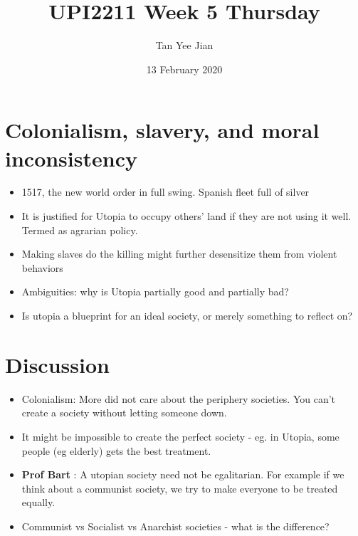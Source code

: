 \documentclass[12pt, a4paper]{article}
\title{UPI2211 Week 5 Thursday}
\author{Tan Yee Jian}
\date{13 February 2020}
\begin{document}
  \maketitle
  \section{Colonialism, slavery, and moral\\inconsistency}%
  \begin{itemize}
    \item 1517, the new world order in full swing. Spanish fleet full of silver
    \item It is justified for Utopia to occupy others' land if they are not
      using it well. Termed as agrarian policy.
    \item Making slaves do the killing might further desensitize them from
      violent behaviors
    \item Ambiguities: why is Utopia partially good and partially bad?
    \item Is utopia a blueprint for an ideal society, or merely something
      to reflect on?
  \end{itemize}
  \section{Discussion}
  \begin{itemize}
    \item Colonialism: More did not care about the periphery societies.
      You can't create a society without letting someone down.
    \item It might be impossible to create the perfect society - eg. in Utopia,
      some people (eg elderly) gets the best treatment.
    \item \textbf{Prof Bart} : A utopian society need not be egalitarian.
      For example if we think about a communist society, we try to make everyone
      to be treated equally.
    \item Communist vs Socialist vs Anarchist societies - what is the difference?
  \end{itemize}
\end{document}
